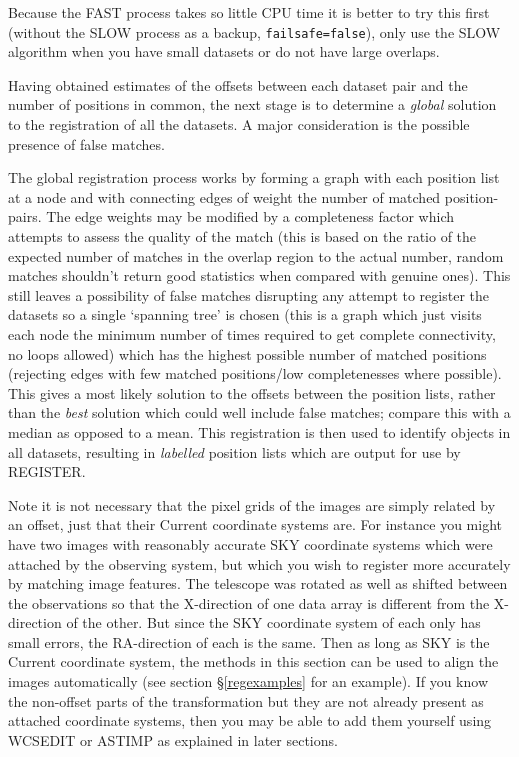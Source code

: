 \documentclass[twoside,11pt]{article}
\renewcommand{\_}{\texttt{\symbol{95}}}
\newcommand{\text}[1]{{\small \tt #1}}
\newcommand{\routine}[1]{{\sc #1}}
\begin{document}
Because the FAST process takes so little CPU time it is better to try
this first (without the SLOW process as a backup,
\text{failsafe=false}), only use the SLOW algorithm when you have
small datasets or do not have large overlaps.

Having obtained estimates of the offsets between each dataset pair and
the number of positions in common, the next stage is to determine a
{\em global} solution to the registration of all the datasets. A major
consideration is the possible presence of false matches.

The global registration process works by forming a graph with each
position list at a node and with connecting edges of weight the number
of matched  position-pairs. The edge weights may be modified by a
completeness factor which attempts to assess the quality of the match
(this is based on the ratio of the expected number of matches in the
overlap region to the actual number, random matches shouldn't return
good statistics when compared with genuine ones). This still leaves a
possibility of false matches disrupting any attempt to register the
datasets so a single `spanning tree' is chosen (this is a graph which
just visits each node the minimum number of times required to get
complete connectivity, no loops allowed) which has the highest possible
number of matched positions (rejecting edges with few matched
positions/low completenesses where possible). This gives a most likely
solution to the offsets between the position lists, rather than the
{\em best} solution which could well include false matches; compare this
with a median as opposed to a mean. This registration is then used to
identify objects in all datasets, resulting in {\em labelled} position
lists which are output for use by \routine{REGISTER}.

Note it is not necessary that the pixel grids of the images are simply 
related by an offset,
just that their Current coordinate systems are.
For instance you might have two images with reasonably accurate
SKY coordinate systems which were attached by the observing system,
but which you wish to register more accurately by matching image features.
The telescope was rotated as well as 
shifted between the observations so that the 
X-direction of one data array is different from the X-direction of
the other.  But since the SKY coordinate system of each only 
has small errors, the RA-direction of each is the same.
Then as long as SKY is the Current coordinate system,
the methods in this section can be used to align the images automatically
(see section \S\ref{regexamples} for an example).
If you know the non-offset parts of the transformation
but they are not already present as attached coordinate systems,
then you may be able to add them yourself using \routine{WCSEDIT} 
or \routine{ASTIMP} as explained in later sections.
\end{document}
